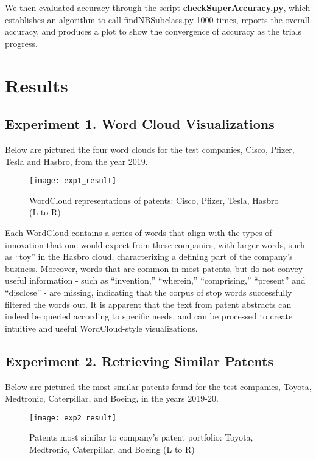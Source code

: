 \documentclass{article}
\begin{document}
We then evaluated accuracy through the script \textbf{checkSuperAccuracy.py}, which establishes an algorithm to call findNBSubclass.py 1000 times, reports the overall accuracy, and produces a plot to show the convergence of accuracy as the trials progress.

\section{Results}
\subsection{Experiment 1. Word Cloud Visualizations}
Below are pictured the four word clouds for the test companies, Cisco, Pfizer, Tesla and Hasbro, from the year 2019.

\begin{figure}[H]
\texttt{[image: exp1\_result]}
\centering
\caption{WordCloud representations of patents: Cisco, Pfizer, Tesla, Hasbro (L to R)}
\label{fig:exp1_result}
\end{figure}

Each WordCloud contains a series of words that align with the types of innovation that one would expect from these companies, with larger words, such as “toy” in the Hasbro cloud, characterizing a defining part of the company’s business.  Moreover, words that are common in most patents, but do not convey useful information - such as “invention,” “wherein,” “comprising,” “present” and “disclose” - are missing, indicating that the corpus of stop words successfully filtered the words out.  It is apparent that the text from patent abstracts can indeed be queried according to specific needs, and can be processed to create intuitive and useful WordCloud-style visualizations.

\subsection{Experiment 2. Retrieving Similar Patents}
Below are pictured the most similar patents found for the test companies, Toyota, Medtronic, Caterpillar, and Boeing, in the years 2019-20.

\begin{figure}[H]
\texttt{[image: exp2\_result]}
\centering
\caption{Patents most similar to company’s patent portfolio: Toyota, Medtronic, Caterpillar, and Boeing (L to R)}
\label{fig:exp2_result}
\end{figure}
\end{document}
